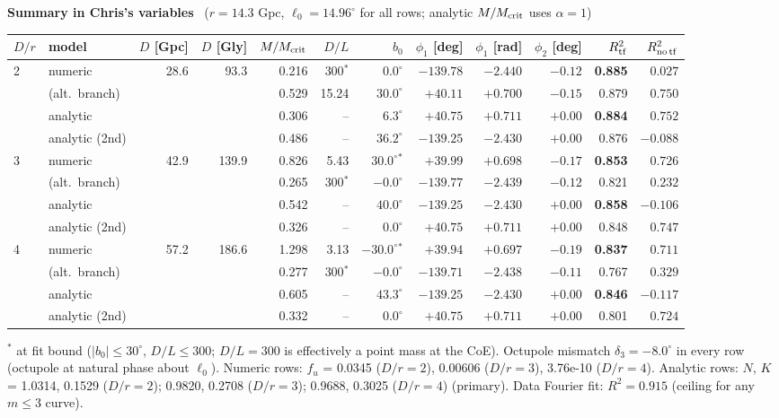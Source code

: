 \documentclass[10pt]{article}
\begin{document}
\clearpage\textbf{\large Summary in Chris's variables} \ ($r=14.3$ Gpc, $\ell_0=14.96^\circ$ for all rows; analytic $M/M_{\rm crit}$ uses $\alpha=1$)
\begin{center}\footnotesize\setlength{\tabcolsep}{3.2pt}\begin{tabular}{llrrrrrrrrrr}\toprule
$D/r$ & model & $D$ [Gpc] & $D$ [Gly] & $M/M_{\rm crit}$ & $D/L$ & $b_0$ & $\phi_1$ [deg] & $\phi_1$ [rad] & $\phi_2$ [deg] & $R^2_{\rm tf}$ & $R^2_{\rm no\,tf}$\\\midrule
2 & numeric & 28.6 & 93.3 & 0.216 & 300$^*$ & $0.0^\circ$ & $-139.78$ & $-2.440$ & $-0.12$ & \textbf{0.885} & $0.027$\\
 & \quad (alt.\ branch) & & & 0.529 & 15.24 & $30.0^\circ$ & $+40.11$ & $+0.700$ & $-0.15$ & 0.879 & $0.750$\\
 & analytic & & & 0.306 & -- & $6.3^\circ$ & $+40.75$ & $+0.711$ & $+0.00$ & \textbf{0.884} & $0.752$\\
 & analytic (2nd) & & & 0.486 & -- & $36.2^\circ$ & $-139.25$ & $-2.430$ & $+0.00$ & 0.876 & $-0.088$\\
\midrule
3 & numeric & 42.9 & 139.9 & 0.826 & 5.43 & $30.0^\circ$$^*$ & $+39.99$ & $+0.698$ & $-0.17$ & \textbf{0.853} & $0.726$\\
 & \quad (alt.\ branch) & & & 0.265 & 300$^*$ & $-0.0^\circ$ & $-139.77$ & $-2.439$ & $-0.12$ & 0.821 & $0.232$\\
 & analytic & & & 0.542 & -- & $40.0^\circ$ & $-139.25$ & $-2.430$ & $+0.00$ & \textbf{0.858} & $-0.106$\\
 & analytic (2nd) & & & 0.326 & -- & $0.0^\circ$ & $+40.75$ & $+0.711$ & $+0.00$ & 0.848 & $0.747$\\
\midrule
4 & numeric & 57.2 & 186.6 & 1.298 & 3.13 & $-30.0^\circ$$^*$ & $+39.94$ & $+0.697$ & $-0.19$ & \textbf{0.837} & $0.711$\\
 & \quad (alt.\ branch) & & & 0.277 & 300$^*$ & $-0.0^\circ$ & $-139.71$ & $-2.438$ & $-0.11$ & 0.767 & $0.329$\\
 & analytic & & & 0.605 & -- & $43.3^\circ$ & $-139.25$ & $-2.430$ & $+0.00$ & \textbf{0.846} & $-0.117$\\
 & analytic (2nd) & & & 0.332 & -- & $0.0^\circ$ & $+40.75$ & $+0.711$ & $+0.00$ & 0.801 & $0.724$\\
\bottomrule
\end{tabular}\end{center}
$^*$ at fit bound ($|b_0|\le30^\circ$, $D/L\le300$; $D/L=300$ is effectively a point mass at the CoE). Octupole mismatch $\delta_3=-8.0^\circ$ in every row (octupole at natural phase about $\ell_0$).
Numeric rows: $f_u$ = 0.0345 ($D/r=2$), 0.00606 ($D/r=3$), 3.76e-10 ($D/r=4$). Analytic rows: $N$, $K$ = 1.0314, 0.1529 ($D/r=2$); 0.9820, 0.2708 ($D/r=3$); 0.9688, 0.3025 ($D/r=4$) (primary). Data Fourier fit: $R^2=0.915$ (ceiling for any $m\le3$ curve).
\end{document}
